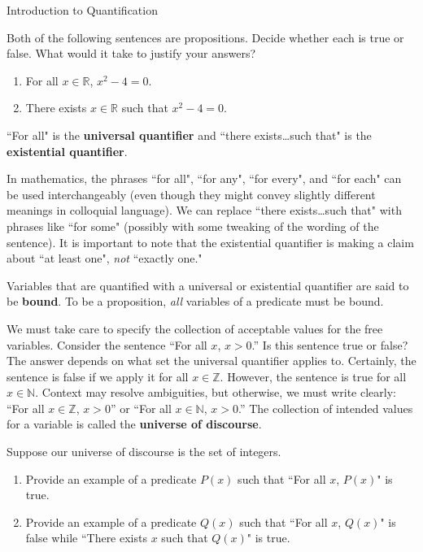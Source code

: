 \begin{section}{Introduction to Quantification}
\begin{problem}\label{ex:quantified predicates}
Both of the following sentences are propositions. Decide whether each is true or false. What would it take to justify your answers?
\begin{enumerate}[label=\textrm{(\alph*)}]
\item For all $x\in\mathbb{R}$, $x^2-4=0$.
\item There exists $x\in\mathbb{R}$ such that $x^2-4=0$.
\end{enumerate}
\end{problem}

\begin{definition}
``For all" is the \textbf{universal quantifier} and ``there exists\ldots such that" is the \textbf{existential quantifier}.
\end{definition}

In mathematics, the phrases ``for all", ``for any", ``for every", and ``for each" can be used interchangeably (even though they might convey slightly different meanings in colloquial language). We can replace ``there exists\ldots such that" with phrases  like ``for some" (possibly with some tweaking of the wording of the sentence). It is important to note that the existential quantifier is making a claim about ``at least one", \emph{not} ``exactly one." 

Variables that are quantified with a universal or existential quantifier are said to be \textbf{bound}.  To be a proposition, \emph{all} variables of a predicate must be bound. %

We must take care to specify the collection of acceptable values for the free variables. Consider the sentence ``For all $x$, $x>0$.'' Is this sentence true or false? The answer depends on what set the universal quantifier applies to. Certainly, the sentence is false if we apply it for all $x\in\mathbb{Z}$. However, the sentence is true for all $x\in\mathbb{N}$. Context may resolve ambiguities, but otherwise, we must write clearly: ``For all $x\in\mathbb{Z}$, $x>0$'' or ``For all $x\in\mathbb{N}$, $x>0$.'' The collection of intended values for a variable is called the \textbf{universe of discourse}. %

\begin{problem}
Suppose our universe of discourse is the set of integers.
\begin{enumerate}[label=\textrm{(\alph*)}]
\item Provide an example of a predicate $P(x)$ such that ``For all $x$, $P(x)$" is true.
\item Provide an example of a predicate $Q(x)$ such that ``For all $x$, $Q(x)$" is false while ``There exists $x$ such that $Q(x)$" is true.
\end{enumerate}
\end{problem}


\end{section}
